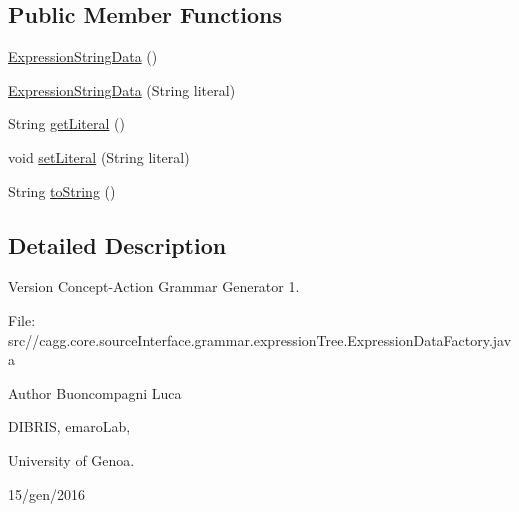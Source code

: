 \subsection*{Public Member Functions}
\begin{DoxyCompactItemize}
\item 
\hyperlink{classit_1_1emarolab_1_1cagg_1_1core_1_1language_1_1syntax_1_1expressionTree_1_1ExpressionDataFactory_1_1ExpressionStringData_a7e201eb992391ac51512722b94c6d5f6}{Expression\-String\-Data} ()
\item 
\hyperlink{classit_1_1emarolab_1_1cagg_1_1core_1_1language_1_1syntax_1_1expressionTree_1_1ExpressionDataFactory_1_1ExpressionStringData_aa5c6a2a20dd05f527cae34592e740c48}{Expression\-String\-Data} (String literal)
\item 
String \hyperlink{classit_1_1emarolab_1_1cagg_1_1core_1_1language_1_1syntax_1_1expressionTree_1_1ExpressionDataFactory_1_1ExpressionStringData_ade95a2ca23f19f791162b8cd56df2c75}{get\-Literal} ()
\item 
void \hyperlink{classit_1_1emarolab_1_1cagg_1_1core_1_1language_1_1syntax_1_1expressionTree_1_1ExpressionDataFactory_1_1ExpressionStringData_a989409c9a569e11401e32e9cd06fa7de}{set\-Literal} (String literal)
\item 
String \hyperlink{classit_1_1emarolab_1_1cagg_1_1core_1_1language_1_1syntax_1_1expressionTree_1_1ExpressionDataFactory_1_1ExpressionStringData_a0c7b586b8647516202b9a9ec3518f5a4}{to\-String} ()
\end{DoxyCompactItemize}


\subsection{Detailed Description}
\begin{DoxyVersion}{Version}
Concept-\/\-Action Grammar Generator 1. \par
 File\-: src//cagg.core.\-source\-Interface.\-grammar.\-expression\-Tree.\-Expression\-Data\-Factory.\-java \par

\end{DoxyVersion}
\begin{DoxyAuthor}{Author}
Buoncompagni Luca \par
 D\-I\-B\-R\-I\-S, emaro\-Lab,\par
 University of Genoa. \par
 15/gen/2016 \par

\end{DoxyAuthor}


